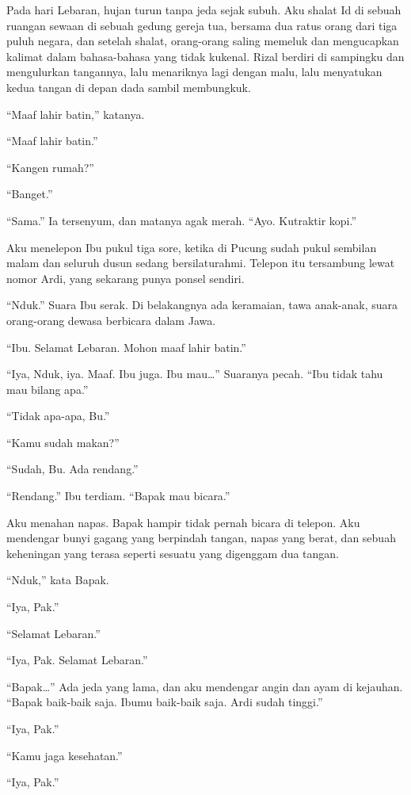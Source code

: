 \documentclass[11pt,twoside,openany]{book}
\begin{document}
Pada hari Lebaran, hujan turun tanpa jeda sejak subuh. Aku shalat Id di sebuah ruangan sewaan di sebuah gedung gereja tua, bersama dua ratus orang dari tiga puluh negara, dan setelah shalat, orang-orang saling memeluk dan mengucapkan kalimat dalam bahasa-bahasa yang tidak kukenal. Rizal berdiri di sampingku dan mengulurkan tangannya, lalu menariknya lagi dengan malu, lalu menyatukan kedua tangan di depan dada sambil membungkuk.

``Maaf lahir batin,'' katanya.

``Maaf lahir batin.''

``Kangen rumah?''

``Banget.''

``Sama.'' Ia tersenyum, dan matanya agak merah. ``Ayo. Kutraktir kopi.''

Aku menelepon Ibu pukul tiga sore, ketika di Pucung sudah pukul sembilan malam dan seluruh dusun sedang bersilaturahmi. Telepon itu tersambung lewat nomor Ardi, yang sekarang punya ponsel sendiri.

``Nduk.'' Suara Ibu serak. Di belakangnya ada keramaian, tawa anak-anak, suara orang-orang dewasa berbicara dalam Jawa.

``Ibu. Selamat Lebaran. Mohon maaf lahir batin.''

``Iya, Nduk, iya. Maaf. Ibu juga. Ibu mau\ldots{}'' Suaranya pecah. ``Ibu tidak tahu mau bilang apa.''

``Tidak apa-apa, Bu.''

``Kamu sudah makan?''

``Sudah, Bu. Ada rendang.''

``Rendang.'' Ibu terdiam. ``Bapak mau bicara.''

Aku menahan napas. Bapak hampir tidak pernah bicara di telepon. Aku mendengar bunyi gagang yang berpindah tangan, napas yang berat, dan sebuah keheningan yang terasa seperti sesuatu yang digenggam dua tangan.

``Nduk,'' kata Bapak.

``Iya, Pak.''

``Selamat Lebaran.''

``Iya, Pak. Selamat Lebaran.''

``Bapak\ldots{}'' Ada jeda yang lama, dan aku mendengar angin dan ayam di kejauhan. ``Bapak baik-baik saja. Ibumu baik-baik saja. Ardi sudah tinggi.''

``Iya, Pak.''

``Kamu jaga kesehatan.''

``Iya, Pak.''
\end{document}
